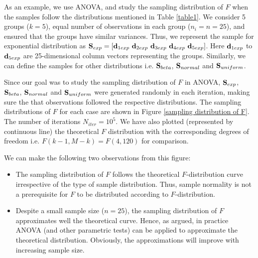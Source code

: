 \documentclass[10pt,final,Twcolumn]{IEEEtran}
\begin{document}
As an example, we use ANOVA, and study the sampling distribution of $F$ when the samples follow the distributions mentioned in Table \ref{table1}. We consider 5 groups ($k=5$), equal number of observations in each group ($n_i = n = 25$), and ensured that the groups have similar variances. Thus, we represent the sample for exponential distribution as ${\bf{S}}_{exp} = [{\bf {d}}_{1exp} \ {\bf {d}}_{2exp} \ {\bf {d}}_{3exp} \ {\bf {d}}_{4exp}\  {\bf {d}}_{5exp}]$. Here ${\bf {d}}_{1exp}$ to ${\bf {d}}_{5exp}$ are 25-dimensional column vectors representing the groups. Similarly, we can define the samples for other distributions i.e. ${\bf{S}}_{beta}$, ${\bf{S}}_{normal}$ and ${\bf{S}}_{uniform}$.

Since our goal was to study the sampling distribution of $F$ in ANOVA, ${\bf{S}}_{exp}$, ${\bf{S}}_{beta}$, ${\bf{S}}_{normal}$ and ${\bf{S}}_{uniform}$ were generated randomly in each iteration, making sure the that observations followed the respective distributions. The sampling distributions of $F$ for each case are shown in Figure \ref{sampling distribution of F}. The number of iterations $N_{iter} = 10^5$. We have also plotted (represented by continuous line) the theoretical $F$ distribution with the corresponding degrees of freedom i.e. $F(k-1,M-k) = F(4,120)$ for comparison.    


We can make the following two observations from this figure:
\begin{itemize}
\item The sampling distribution of $F$ follows the theoretical $F$-distribution curve irrespective of the type of sample distribution. Thus, sample normality is not a prerequisite for  $F$ to be distributed according to $F$-distribution.  

\item Despite a small sample size ($n=25$), the sampling distribution of $F$ approximates well the theoretical curve. Hence, as argued, in practice ANOVA (and other parametric tests) can be applied to approximate the theoretical distribution. Obviously, the approximations will improve with increasing sample size.  

\end{itemize}
\end{document}
